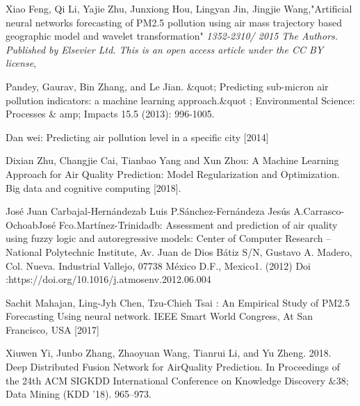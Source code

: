 
\clearpage
{}
\begin{thebibliography}{99}

Xiao Feng, Qi Li, Yajie Zhu, Junxiong Hou, Lingyan Jin, Jingjie Wang,"Artificial neural networks forecasting of PM2.5 pollution using air mass
trajectory based geographic model and wavelet transformation" {\em 1352-2310/ 2015 The Authors. Published by Elsevier Ltd. This is an open access article under the CC BY license}, 


Pandey, Gaurav, Bin Zhang, and Le Jian. \&quot; Predicting sub-micron air pollution indicators: a machine learning approach.\&quot ; Environmental Science: Processes \& amp; Impacts 15.5 (2013): 996-1005.

Dan wei: Predicting air pollution level in a specific city
[2014]

Dixian Zhu, Changjie Cai, Tianbao Yang and Xun Zhou: A
Machine Learning Approach for Air Quality Prediction:
Model Regularization and Optimization. Big data and
cognitive computing [2018].

José Juan Carbajal-Hernándezab Luis P.Sánchez-Fernándeza
Jesús A.Carrasco-OchoabJosé Fco.Martínez-Trinidadb:
Assessment and prediction of air quality using fuzzy logic
and autoregressive models: Center of Computer Research –
National Polytechnic Institute, Av. Juan de Dios Bátiz S/N,
Gustavo A. Madero, Col. Nueva. Industrial Vallejo, 07738
México D.F., Mexico1. (2012) Doi
:https://doi.org/10.1016/j.atmosenv.2012.06.004

Sachit Mahajan, Ling-Jyh Chen, Tzu-Chieh Tsai : An
Empirical Study of PM2.5 Forecasting Using neural network.
IEEE Smart World Congress, At San Francisco, USA [2017]

Xiuwen Yi, Junbo Zhang, Zhaoyuan Wang, Tianrui Li, and Yu Zheng. 2018. Deep
Distributed Fusion Network for AirQuality Prediction. In Proceedings of the 24th
ACM SIGKDD International Conference on Knowledge Discovery \&38; Data Mining (KDD ’18). 965–973.


\end{thebibliography}
